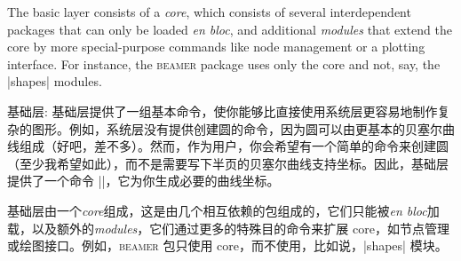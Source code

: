 \begin{description}
\begin{paracol}{2}
        The basic layer consists of a \emph{core}, which consists of several
        interdependent packages that can only be loaded \emph{en bloc}, and
        additional \emph{modules} that extend the core by more
        special-purpose commands like node management or a plotting
        interface. For instance, the \textsc{beamer} package uses only the
        core and not, say, the |shapes| modules.
\switchcolumn
    \item[基础层:]         
    基础层提供了一组基本命令，使你能够比直接使用系统层更容易地制作复杂的图形。例如，系统层没有提供创建圆的命令，因为圆可以由更基本的贝塞尔曲线组成（好吧，差不多）。然而，作为用户，你会希望有一个简单的命令来创建圆（至少我希望如此），而不是需要写下半页的贝塞尔曲线支持坐标。因此，基础层提供了一个命令 |\pgfpathcircle|，它为你生成必要的曲线坐标。
    
            基础层由一个\emph{core}组成，这是由几个相互依赖的包组成的，它们只能被\emph{en bloc}加载，以及额外的\emph{modules}，它们通过更多的特殊目的命令来扩展 core，如节点管理或绘图接口。例如，\textsc{beamer} 包只使用 core，而不使用，比如说，|shapes| 模块。
\end{paracol}
\end{description}


